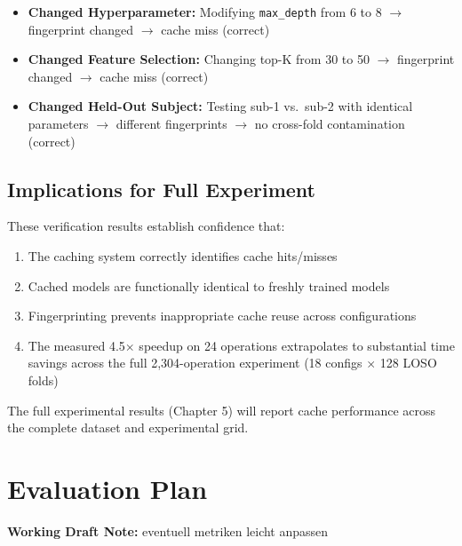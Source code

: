 \documentclass{imc-inf} %
\begin{document}
\begin{itemize}
\item \textbf{Changed Hyperparameter:} Modifying \verb|max_depth| from 6 to 8 
      $\rightarrow$ fingerprint changed $\rightarrow$ cache miss (correct)
\item \textbf{Changed Feature Selection:} Changing top-K from 30 to 50 $\rightarrow$ 
      fingerprint changed $\rightarrow$ cache miss (correct)
\item \textbf{Changed Held-Out Subject:} Testing sub-1 vs.\ sub-2 with identical 
      parameters $\rightarrow$ different fingerprints $\rightarrow$ no cross-fold 
      contamination (correct)
\end{itemize}

\subsection{Implications for Full Experiment}

These verification results establish confidence that:
\begin{enumerate}
\item The caching system correctly identifies cache hits/misses
\item Cached models are functionally identical to freshly trained models
\item Fingerprinting prevents inappropriate cache reuse across configurations
\item The measured 4.5$\times$ speedup on 24 operations extrapolates to substantial 
      time savings across the full 2,304-operation experiment (18 configs $\times$ 
      128 LOSO folds)
\end{enumerate}

The full experimental results (Chapter 5) will report cache performance across 
the complete dataset and experimental grid.


\section{Evaluation Plan}



\begin{center}
\colorbox{yellow!20}{%
\begin{minipage}{0.9\textwidth}
\textbf{Working Draft Note:} 
eventuell metriken leicht anpassen
\end{minipage}
}
\end{center}
\label{sec:evaluation_plan}
\end{document}
